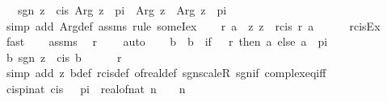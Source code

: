 \begin{isabellebody}
\ \ \ {\isachardoublequoteopen}sgn\ z\ {\isacharequal}{\kern0pt}\ cis\ {\isacharparenleft}{\kern0pt}Arg\ z{\isacharparenright}{\kern0pt}\ {\isasymand}\ {\isacharminus}{\kern0pt}pi\ {\isacharless}{\kern0pt}\ Arg\ z\ {\isasymand}\ Arg\ z\ {\isasymle}\ pi{\isachardoublequoteclose}\isanewline
%
\isadelimproof
%
\endisadelimproof
%
\isatagproof
{}\isamarkupfalse%
\ {\isacharparenleft}{\kern0pt}simp\ add{\isacharcolon}{\kern0pt}\ Arg{\isacharunderscore}{\kern0pt}def\ assms{\isacharcomma}{\kern0pt}\ rule\ someI{\isacharunderscore}{\kern0pt}ex{\isacharparenright}{\kern0pt}\isanewline
\ \ \isamarkupfalse%
\ r\ a\ \ z{\isacharcolon}{\kern0pt}\ {\isachardoublequoteopen}z\ {\isacharequal}{\kern0pt}\ rcis\ r\ a{\isachardoublequoteclose}\isanewline
\ \ \ \ \isamarkupfalse%
\ rcis{\isacharunderscore}{\kern0pt}Ex\ \isamarkupfalse%
\ fast\isanewline
\ \ \isamarkupfalse%
\ assms\ \isamarkupfalse%
\ {\isachardoublequoteopen}r\ {\isasymnoteq}\ {}{\isachardoublequoteclose}\ \isamarkupfalse%
\ auto\isanewline
\ \ \isamarkupfalse%
\ b\ \ {\isachardoublequoteopen}b\ {\isacharequal}{\kern0pt}\ {\isacharparenleft}{\kern0pt}if\ {}\ {\isacharless}{\kern0pt}\ r\ then\ a\ else\ a\ {\isacharplus}{\kern0pt}\ pi{\isacharparenright}{\kern0pt}{\isachardoublequoteclose}\isanewline
\ \ \isamarkupfalse%
\ b{\isacharcolon}{\kern0pt}\ {\isachardoublequoteopen}sgn\ z\ {\isacharequal}{\kern0pt}\ cis\ b{\isachardoublequoteclose}\isanewline
\ \ \ \ \isamarkupfalse%
\ {\isacartoucheopen}r\ {\isasymnoteq}\ {}{\isacartoucheclose}\ \isamarkupfalse%
\ {\isacharparenleft}{\kern0pt}simp\ add{\isacharcolon}{\kern0pt}\ z\ b{\isacharunderscore}{\kern0pt}def\ rcis{\isacharunderscore}{\kern0pt}def\ of{\isacharunderscore}{\kern0pt}real{\isacharunderscore}{\kern0pt}def\ sgn{\isacharunderscore}{\kern0pt}scaleR\ sgn{\isacharunderscore}{\kern0pt}if\ complex{\isacharunderscore}{\kern0pt}eq{\isacharunderscore}{\kern0pt}iff{\isacharparenright}{\kern0pt}\isanewline
\ \ \isamarkupfalse%
\ cis{\isacharunderscore}{\kern0pt}{}pi{\isacharunderscore}{\kern0pt}nat{\isacharcolon}{\kern0pt}\ {\isachardoublequoteopen}cis\ {\isacharparenleft}{\kern0pt}{}\ {\isacharasterisk}{\kern0pt}\ pi\ {\isacharasterisk}{\kern0pt}\ real{\isacharunderscore}{\kern0pt}of{\isacharunderscore}{\kern0pt}nat\ n{\isacharparenright}{\kern0pt}\ {\isacharequal}{\kern0pt}\ {}{\isachardoublequoteclose}\ \ n\isanewline

\end{isabellebody}
